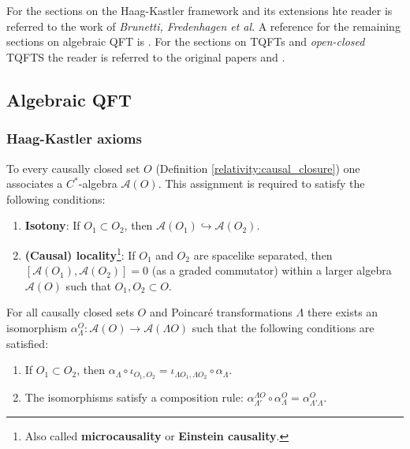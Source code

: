 \chapter{}

    For the sections on the Haag-Kastler framework and its extensions hte reader is referred to the work of \textit{Brunetti, Fredenhagen et al}. A reference for the remaining sections on algebraic QFT is \cite{baez_aqft}. For the sections on TQFTs and \textit{open-closed} TQFTS the reader is referred to the original papers \cite{atiyah} and \cite{open_closed}.

\section{Algebraic QFT}
\subsection{Haag-Kastler axioms}

    \begin{axiom}\label{aqft:microcausality}
        To every causally closed set $O$ (Definition \ref{relativity:causal_closure}) one associates a $C^*$-algebra $\mathcal{A}(O)$. This assignment is required to satisfy the following conditions:
        \begin{enumerate}
            \item\textbf{Isotony}: If $O_1\subset O_2$, then $\mathcal{A}(O_1)\hookrightarrow\mathcal{A}(O_2)$.
            \item\textbf{(Causal) locality}\footnote{Also called \textbf{microcausality} or \textbf{Einstein causality}.}: If $O_1$ and $O_2$ are spacelike separated, then $[\mathcal{A}(O_1),\mathcal{A}(O_2)] = 0$ (as a graded commutator) within a larger algebra $\mathcal{A}(O)$ such that $O_1,O_2\subset O$.
        \end{enumerate}
    \end{axiom}

    \begin{axiom}
        For all causally closed sets $O$ and Poincar\'e transformations $\Lambda$ there exists an isomorphism $\alpha^O_\Lambda:\mathcal{A}(O)\rightarrow\mathcal{A}(\Lambda O)$ such that the following conditions are satisfied:
        \begin{enumerate}
            \item If $O_1\subset O_2$, then $\alpha_\Lambda\circ\iota_{O_1,O_2} = \iota_{\Lambda O_1,\Lambda O_2}\circ\alpha_\Lambda$.
            \item The isomorphisms satisfy a composition rule: $\alpha^{\Lambda O}_{\Lambda'}\circ\alpha^O_\Lambda = \alpha^O_{\Lambda'\Lambda}$.
        \end{enumerate}
    \end{axiom}

